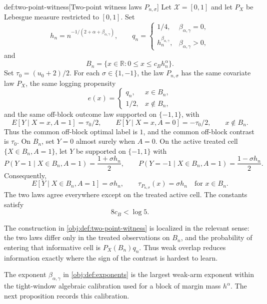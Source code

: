 \documentclass[11pt]{article}
\begin{document}
\begin{definitionv}{def:two-point-witness}[Two-point witness laws \(P_{n,\sigma}\)]
Let \(\mathcal X=[0,1]\) and let \(P_X\) be Lebesgue measure restricted to \([0,1]\). Set
\[
h_n=n^{-1/(2+\alpha+\beta_{\alpha,\gamma})},
\qquad
q_n=
\begin{cases}
1/4, & \beta_{\alpha,\gamma}=0,\\
h_n^{\beta_{\alpha,\gamma}}, & \beta_{\alpha,\gamma}>0,
\end{cases}
\]
and
\[
B_n=\{x\in\mathbb R:0\le x\le c_Bh_n^\alpha\}.
\]
Set \(\tau_0=(u_0+2)/2\). For each \(\sigma\in\{1,-1\}\), the law \(P_{n,\sigma}\) has the same covariate law \(P_X\), the same logging propensity
\[
e(x)=
\begin{cases}
q_n, & x\in B_n,\\
1/2, & x\notin B_n,
\end{cases}
\]
and the same off-block outcome law supported on \(\{-1,1\}\), with
\[
E[Y\mid X=x,A=1]=\tau_0/2,
\qquad
E[Y\mid X=x,A=0]=-\tau_0/2,
\qquad x\notin B_n .
\]
Thus the common off-block optimal label is \(1\), and the common off-block contrast is \(\tau_0\). On \(B_n\), set \(Y=0\) almost surely when \(A=0\). On the active treated cell \(\{X\in B_n,A=1\}\), let \(Y\) be supported on \(\{-1,1\}\) with
\[
P(Y=1\mid X\in B_n,A=1)=\frac{1+\sigma h_n}{2},
\qquad
P(Y=-1\mid X\in B_n,A=1)=\frac{1-\sigma h_n}{2}.
\]
Consequently,
\[
E[Y\mid X\in B_n,A=1]=\sigma h_n,
\qquad
\tau_{P_{n,\sigma}}(x)=\sigma h_n
\quad\text{for }x\in B_n .
\]
The two laws agree everywhere except on the treated active cell. The constants satisfy
\[
8c_B<\log 5 .
\]
\end{definitionv}

The construction in \cref{obj:def:two-point-witness} is localized in the relevant sense: the two laws differ only in the treated observations on \(B_n\), and the probability of entering that informative cell is \(P_X(B_n)q_n\).  Thus weak overlap reduces information exactly where the sign of the contrast is hardest to learn.

The exponent \(\beta_{\alpha,\gamma}\) in \cref{obj:def:exponents} is the largest weak-arm exponent within the tight-window algebraic calibration used for a block of margin mass \(h^\alpha\).  The next proposition records this calibration.
\end{document}
